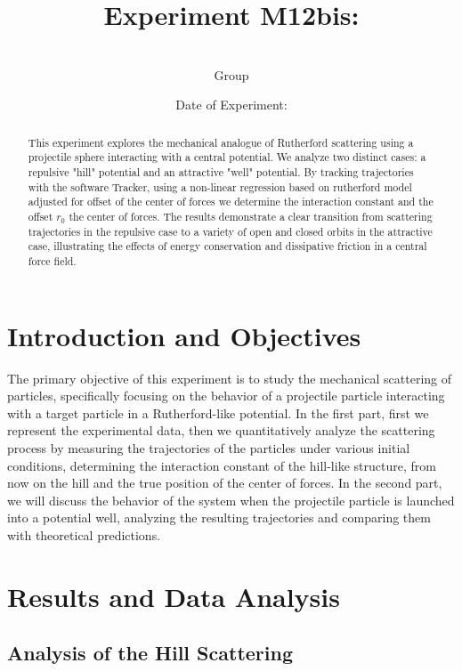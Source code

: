\documentclass[a4paper,11pt]{article}
\title{\textbf{Experiment M12bis: \experimentTitle}}
\author{\authorName \\ Group \groupNumber}
\date{Date of Experiment: \experimentDate}
\begin{document}
\maketitle

\begin{abstract}
    This experiment explores the mechanical analogue of Rutherford scattering using a projectile sphere
     interacting with a central potential. 
     We analyze two distinct cases: a repulsive "hill" potential and an attractive "well" potential. 
     By tracking trajectories with the software Tracker, using a non-linear regression based on rutherford model adjusted for offset of the center of forces
     we determine the interaction constant and the offset $r_0$
    the center of forces. The results demonstrate a clear transition from scattering trajectories in the
    repulsive case to a variety of open and closed orbits in the attractive case,
    illustrating the effects of energy conservation and dissipative friction in a central force field.
\end{abstract}

\tableofcontents
\newpage

\section{Introduction and Objectives}
The primary objective of this experiment is to study the mechanical scattering of particles, specifically focusing on the behavior of a projectile particle interacting with a target particle in a Rutherford-like potential.
In the first part, first we represent the experimental data, then we quantitatively analyze the scattering process by measuring the trajectories of the particles under various initial conditions, 
determining the interaction constant of the hill-like structure, from now on the hill and the true position of the center of forces.
In the second part, we will discuss the behavior of the system when the projectile particle is launched into a potential well, analyzing the resulting trajectories and comparing them with theoretical predictions.


\section{Results and Data Analysis}

\subsection{Analysis of the Hill Scattering}
\end{document}
